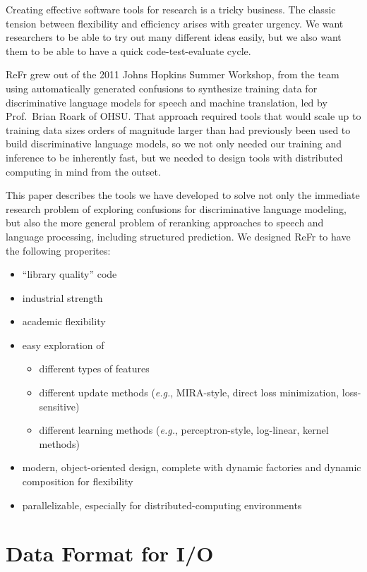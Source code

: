 \documentclass[a4paper]{article}
\begin{document}
Creating effective software tools for research is a tricky business.
The classic tension between flexibility and efficiency arises with
greater urgency. We want researchers to be able to try out many
different ideas easily, but we also want them to be able to have a
quick code-test-evaluate cycle.

ReFr grew out of the 2011 Johns Hopkins Summer Workshop, from the team
using automatically generated confusions to synthesize training data
for discriminative language models for speech and machine translation,
led by Prof.\ Brian Roark of OHSU.  That approach required tools that
would scale up to training data sizes orders of magnitude larger than
had previously been used to build discriminative language models, so
we not only needed our training and inference to be inherently fast,
but we needed to design tools with distributed computing in mind from
the outset.

This paper describes the tools we have developed to solve not only the
immediate research problem of exploring confusions for discriminative
language modeling, but also the more general problem of reranking
approaches to speech and language processing, including structured
prediction. We designed ReFr to have the following properites:
\begin{itemize}[noitemsep]
\item ``library quality'' code
\item industrial strength
\item academic flexibility
\item easy exploration of
  \begin{itemize}[noitemsep]
    \item different types of features
    \item different update methods (\emph{e.g.}, MIRA-style, direct
      loss minimization, loss-sensitive)
    \item different learning methods (\emph{e.g.}, perceptron-style,
      log-linear, kernel methods)
  \end{itemize}
\item modern, object-oriented design, complete with dynamic factories
  and dynamic composition for flexibility
\item parallelizable, especially for distributed-computing
  environments
\end{itemize}
\section{Data Format for I/O}
\end{document}
